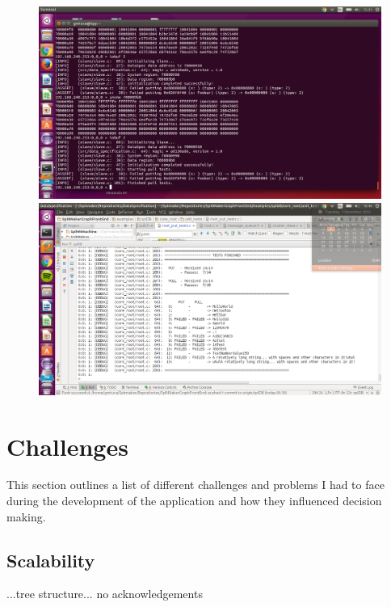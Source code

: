 \begin{figure}
  \centering
  \includegraphics[width=1.15\linewidth, natwidth=1366, natheight=768]{images/debugging.png}
  \label{fig:debugging}
  \centering
  \includegraphics[width=1.15\linewidth, natwidth=1366, natheight=768]{images/testing.png}
  \label{fig:testing}
\end{figure}

\section{Challenges}
This section outlines a list of different challenges and problems I had to face during the development of the application and how they influenced decision making.

\subsection{Scalability}
...tree structure...
no acknowledgements

